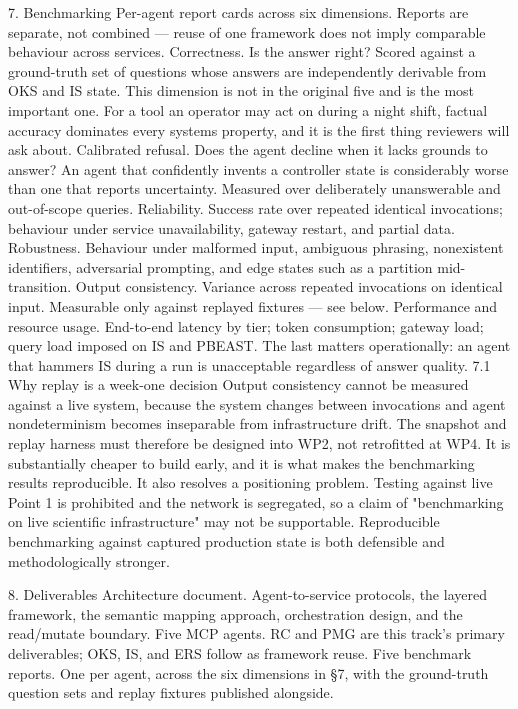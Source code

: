 7. Benchmarking
Per-agent report cards across six dimensions. Reports are separate, not combined — reuse of one framework does not imply comparable behaviour across services.
Correctness. Is the answer right? Scored against a ground-truth set of questions whose answers are independently derivable from OKS and IS state. This dimension is not in the original five and is the most important one. For a tool an operator may act on during a night shift, factual accuracy dominates every systems property, and it is the first thing reviewers will ask about.
Calibrated refusal. Does the agent decline when it lacks grounds to answer? An agent that confidently invents a controller state is considerably worse than one that reports uncertainty. Measured over deliberately unanswerable and out-of-scope queries.
Reliability. Success rate over repeated identical invocations; behaviour under service unavailability, gateway restart, and partial data.
Robustness. Behaviour under malformed input, ambiguous phrasing, nonexistent identifiers, adversarial prompting, and edge states such as a partition mid-transition.
Output consistency. Variance across repeated invocations on identical input. Measurable only against replayed fixtures — see below.
Performance and resource usage. End-to-end latency by tier; token consumption; gateway load; query load imposed on IS and PBEAST. The last matters operationally: an agent that hammers IS during a run is unacceptable regardless of answer quality.
7.1 Why replay is a week-one decision
Output consistency cannot be measured against a live system, because the system changes between invocations and agent nondeterminism becomes inseparable from infrastructure drift.
The snapshot and replay harness must therefore be designed into WP2, not retrofitted at WP4. It is substantially cheaper to build early, and it is what makes the benchmarking results reproducible.
It also resolves a positioning problem. Testing against live Point 1 is prohibited and the network is segregated, so a claim of "benchmarking on live scientific infrastructure" may not be supportable. Reproducible benchmarking against captured production state is both defensible and methodologically stronger.

8. Deliverables
Architecture document. Agent-to-service protocols, the layered framework, the semantic mapping approach, orchestration design, and the read/mutate boundary.
Five MCP agents. RC and PMG are this track's primary deliverables; OKS, IS, and ERS follow as framework reuse.
Five benchmark reports. One per agent, across the six dimensions in §7, with the ground-truth question sets and replay fixtures published alongside.

